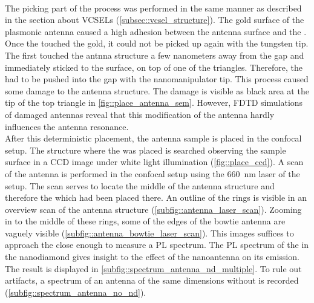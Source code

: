 			\\
			The picking part of the \pp process was performed in the same manner as described in the section about VCSELs (\cref{subsec::vcsel_structure}).
			The gold surface of the plasmonic antenna caused a high adhesion between the antenna surface and the \nd.
			Once the \nd touched the gold, it could not be picked up again with the tungsten tip.
			The \nd first touched the antnna structure a few nanometers away from the gap and immediately sticked to the surface, on top of one of the triangles.
			Therefore, the \nd had to be pushed into the gap with the nanomanipulator tip.
			This process caused some damage to the antenna structure.
			The damage is visible as black area at the tip of the top triangle in \cref{fig::place_antenna_sem}.
			However, FDTD simulations of damaged antennas reveal that this modification of the antenna hardly influences the antenna resonance.
			\\
			After this deterministic placement, the antenna sample is placed in the confocal setup.
			The structure where the \nd was placed is searched observing the sample surface in a CCD image under white light illumination (\cref{fig::place_ccd}). 
			A scan of the antenna is performed in the confocal setup using the \SI{660}{nm} \cw laser of the setup.
			The scan serves to locate the middle of the antenna structure and therefore the \nd which had been placed there.
			An outline of the rings is visible in an overview scan of the antenna structure (\cref{subfig::antenna_laser_scan}).
			Zooming in to the middle of these rings, some of the edges of the bowtie antenna are vaguely visible (\cref{subfig::antenna_bowtie_laser_scan}).
			This images suffices to approach the \nd close enough to measure a PL spectrum.
			The PL spectrum of the \siv in the nanodiamond gives insight to the effect of the nanoantenna on its emission. 
			The result is displayed in \cref{subfig::spectrum_antenna_nd_multiple}.
			To rule out artifacts, a spectrum of an antenna of the same dimensions without \nd is recorded (\cref{subfig::spectrum_antenna_no_nd}).

